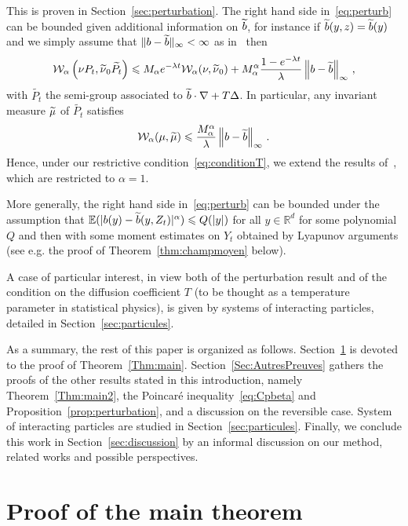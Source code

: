 \documentclass[AHL,Unicode,longabstracts,published]{cedram}
\newcommand{\R}{\mathbb R}
\newcommand{\bbE}{\mathbb E}
\newcommand{\clW}{\mathcal W}
\newcommand{\na}{\nabla}
\newcommand{\1}{\mathbbm{1}}
\newcommand{\nv}[1]{#1}
\let\oldtilde\tilde
\renewcommand*{\tilde}[1]{\mathchoice{\widetilde{#1}}{\widetilde{#1}}{\oldtilde{#1}}{\oldtilde{#1}}}
\newcommand{\R}{\mathbb R}
\newcommand{\clW}{\mathcal W}
\begin{document}
This is proven in Section~\ref{sec:perturbation}. The right hand side in~\eqref{eq:perturb} can be bounded given additional information on $\tilde b$, for instance if $\tilde b(y,z)= \tilde b(y)$ and we simply assume that $\|b-\tilde b\|_\infty < \infty$ as in~\cite{DiscreteSticky,EberleZimmer} then
\[
\clW_\alpha\left(\nu P_t,\tilde \nu_0 \widetilde{P_t}\right) \leqslant M_\alpha e^{-\lambda t} \clW_\alpha(\nu,\tilde \nu_0)+ M_\alpha^\alpha \frac{1- e^{\nv{-\lambda t}}}\lambda \left\|b-\tilde b\right\|_\infty\,,
\]
with $\widetilde{P_t}$ the semi-group associated to $\tilde b\cdot\na + T\Delta$. In particular, any invariant measure $\tilde\mu$ of $\widetilde{P_t}$ satisfies
\[
\clW_\alpha(\mu,\tilde \mu) \leqslant \frac{M_\alpha^\alpha}\lambda \left\|b-\tilde b\right\|_\infty\,.
\]
Hence, under our restrictive condition~\eqref{eq:conditionT}, we extend the results of~\cite{EberleZimmer}, which are restricted to $\alpha=1$.

More generally, the right hand side in~\eqref{eq:perturb} can be bounded under the assumption that $\bbE(|b(y)-\tilde b(y,Z_t)|^\alpha) \leqslant Q(|y|)$ for all $y\in\R^d$ for some polynomial $Q$ and then with some moment estimates on $Y_t$ obtained by Lyapunov arguments (see e.g. the proof of Theorem~\ref{thm:champmoyen} below).

A case of particular interest, in view both of the perturbation result and of the condition on the diffusion coefficient $T$ (to be thought as a temperature parameter in statistical physics), is given by systems of interacting particles, detailed in Section~\ref{sec:particules}.




As a summary, the rest of this paper is organized as follows. Section~\ref{Sec:preuveThmMain} is devoted to the proof of Theorem~\ref{Thm:main}. Section~\ref{Sec:AutresPreuves} gathers the proofs of the other results stated in this introduction, namely Theorem~\ref{Thm:main2}, the Poincaré inequality~\eqref{eq:Cpbeta} and Proposition~\ref{prop:perturbation}, and a discussion on the reversible case. System of interacting particles are studied in Section~\ref{sec:particules}. Finally, we conclude this work in Section~\ref{sec:discussion} by an informal discussion on our method, related works and possible perspectives.

\section{Proof of the main theorem}\label{Sec:preuveThmMain}
\end{document}
